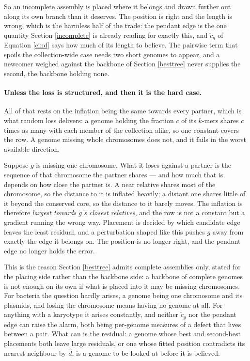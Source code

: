 \documentclass[pdflatex,sn-vancouver-num]{sn-jnl}
\begin{document}
So an incomplete assembly is placed where it belongs and drawn further out along its own branch than
it deserves. The position is right and the length is wrong, which is the harmless half of the trade:
the pendant edge is the one quantity Section \ref{incomplete} is already reading for exactly this, and
$\tilde{c}_g$ of Equation \eqref{cind} says how much of its length to believe. The pairwise term that spoils the collection-wide
case needs two short genomes to appear, and a newcomer weighed against the backbone of
Section \ref{besttree} never supplies the second, the backbone holding none.

\paragraph{Unless the loss is structured, and then it is the hard case.} All of that rests on the
inflation being the same towards every partner, which is what random loss delivers: a genome holding
the fraction $c$ of its $k$-mers shares $c$ times as many with each member of the collection alike, so
one constant covers the row. A genome missing whole chromosomes does not, and it fails in the
worst available direction.

Suppose $g$ is missing one chromosome. What it loses against a partner is the sequence of that
chromosome the partner shares --- and how much that is depends on how close the partner is. A near
relative shares most of the chromosome, so the distance to it is inflated heavily; a distant one
shares little of it beyond the conserved core, so the distance to it barely moves. The inflation is
therefore \emph{largest towards $g$'s closest relatives}, and the row is not a constant but a gradient
running the wrong way. Placement is decided by which candidate edge leaves the least residual, and a
perturbation shaped like this pushes $g$ away from exactly the edge it belongs on. The position is no
longer right, and the pendant edge no longer holds the error.

This is the reason Section \ref{besttree} admits complete assemblies only, stated for the placing
side rather than the backbone side: a backbone of complete genomes is not enough on its own if what
is placed into it may be missing chromosomes. For bacteria the question hardly arises, a genome being
one chromosome and its plasmids, and losing the chromosome means having no genome at all. For
anything with a karyotype it arises constantly, and neither $\tilde{c}_g$ nor the pendant edge can
raise the alarm, both being per-genome measures of a defect that lives between a pair. What can is
the residual: a genome whose best and second-best placements both leave large residuals, or one whose
fitted position contradicts its nearest neighbour by $\widehat{d}$, is a genome to be looked at before
it is believed.
\end{document}
